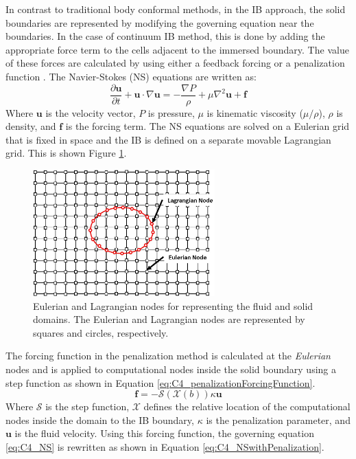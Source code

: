 In contrast to traditional body conformal methods, in the IB approach, the solid boundaries are represented by modifying the governing equation near the boundaries. In the case of continuum IB method, this is done by adding the appropriate force term to the cells adjacent to the immersed boundary. The value of these forces are calculated by using either a feedback forcing \cite{goldstein1993modeling} or a penalization function \cite{arquis1984conditions}. The Navier-Stokes (NS) equations are written as:
%
\begin{equation}\label{eq:C4_NS}
    \frac{\partial \mathbf{u}}{\partial t} + \mathbf{u} \cdot \nabla \mathbf{u} = 
    -\frac{\nabla P}{\rho} + \mu \nabla^2 \mathbf{u} + \mathbf{f}
\end{equation}
%
Where $\mathbf{u}$ is the velocity vector, $P$ is pressure, $\mu$ is kinematic viscosity ($\mu / \rho$), $\rho$ is density, and $\mathbf{f}$ is the forcing term. The NS equations are solved on a Eulerian grid that is fixed in space and the IB is defined on a separate movable Lagrangian grid. This is shown Figure \ref{fig:C4_lagrangianAndEulerianDomain}.
%
\begin{figure}[H]
    \centering
    \includegraphics[width=7.00cm]{Chapter_4/figure/lagrangian_and_eulerian_nodes.jpg}
    \caption{Eulerian and Lagrangian nodes for representing the fluid and solid domains. The Eulerian and Lagrangian nodes are represented by squares and circles, respectively.}
    \label{fig:C4_lagrangianAndEulerianDomain}
\end{figure}
%
The forcing function in the penalization method is calculated at the \emph{Eulerian} nodes and is applied to computational nodes inside the solid boundary using a step function as shown in Equation \eqref{eq:C4_penalizationForcingFunction}.
%
\begin{equation}\label{eq:C4_penalizationForcingFunction}
    \mathbf{f} = -\mathcal{S}(\mathcal{X}(b)) \kappa \mathbf{u}
\end{equation}
%
Where $\mathcal{S}$ is the step function, $\mathcal{X}$ defines the relative location of the computational nodes inside the domain to the IB boundary, $\kappa$ is the penalization parameter, and $\mathbf{u}$ is the fluid velocity. Using this forcing function, the governing equation \eqref{eq:C4_NS} is rewritten as shown in Equation \eqref{eq:C4_NSwithPenalization}.
